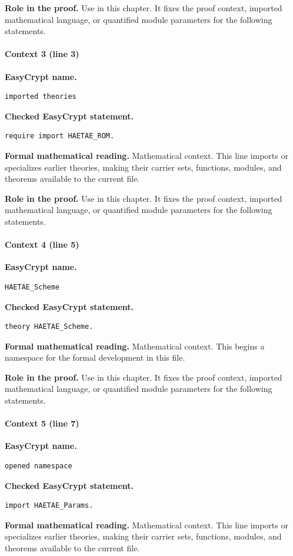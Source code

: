 \noindent\textbf{Role in the proof.}
Use in this chapter. It fixes the proof context, imported mathematical language, or quantified module parameters for the following statements.

\paragraph{Context 3 (line 3)}
\noindent\textbf{EasyCrypt name.}
\begin{lstlisting}[language=EasyCrypt,basicstyle=\ttfamily\scriptsize]
imported theories
\end{lstlisting}
\noindent\textbf{Checked EasyCrypt statement.}
\begin{lstlisting}[language=EasyCrypt,basicstyle=\ttfamily\scriptsize]
require import HAETAE_ROM.
\end{lstlisting}
\noindent\textbf{Formal mathematical reading.}
Mathematical context. This line imports or specializes earlier theories, making their carrier sets, functions, modules, and theorems available to the current file.

\noindent\textbf{Role in the proof.}
Use in this chapter. It fixes the proof context, imported mathematical language, or quantified module parameters for the following statements.

\paragraph{Context 4 (line 5)}
\noindent\textbf{EasyCrypt name.}
\begin{lstlisting}[language=EasyCrypt,basicstyle=\ttfamily\scriptsize]
HAETAE_Scheme
\end{lstlisting}
\noindent\textbf{Checked EasyCrypt statement.}
\begin{lstlisting}[language=EasyCrypt,basicstyle=\ttfamily\scriptsize]
theory HAETAE_Scheme.
\end{lstlisting}
\noindent\textbf{Formal mathematical reading.}
Mathematical context. This begins a namespace for the formal development in this file.

\noindent\textbf{Role in the proof.}
Use in this chapter. It fixes the proof context, imported mathematical language, or quantified module parameters for the following statements.

\paragraph{Context 5 (line 7)}
\noindent\textbf{EasyCrypt name.}
\begin{lstlisting}[language=EasyCrypt,basicstyle=\ttfamily\scriptsize]
opened namespace
\end{lstlisting}
\noindent\textbf{Checked EasyCrypt statement.}
\begin{lstlisting}[language=EasyCrypt,basicstyle=\ttfamily\scriptsize]
import HAETAE_Params.
\end{lstlisting}
\noindent\textbf{Formal mathematical reading.}
Mathematical context. This line imports or specializes earlier theories, making their carrier sets, functions, modules, and theorems available to the current file.

